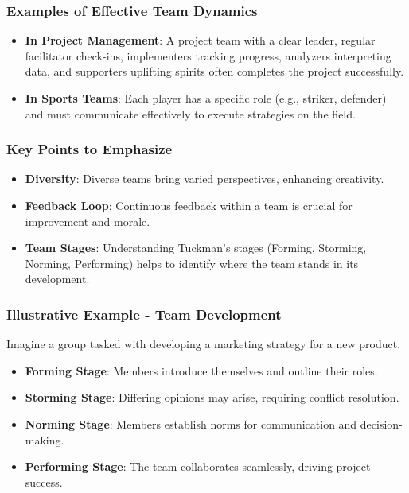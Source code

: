 \documentclass[aspectratio=169]{beamer}
\begin{document}
\begin{frame}[fragile]
    \frametitle{Examples of Effective Team Dynamics}
    \begin{itemize}
        \item \textbf{In Project Management}: A project team with a clear leader, regular facilitator check-ins, implementers tracking progress, analyzers interpreting data, and supporters uplifting spirits often completes the project successfully.
        \item \textbf{In Sports Teams}: Each player has a specific role (e.g., striker, defender) and must communicate effectively to execute strategies on the field.
    \end{itemize}
\end{frame}

\begin{frame}[fragile]
    \frametitle{Key Points to Emphasize}
    \begin{itemize}
        \item \textbf{Diversity}: Diverse teams bring varied perspectives, enhancing creativity.
        \item \textbf{Feedback Loop}: Continuous feedback within a team is crucial for improvement and morale.
        \item \textbf{Team Stages}: Understanding Tuckman's stages (Forming, Storming, Norming, Performing) helps to identify where the team stands in its development.
    \end{itemize}
\end{frame}

\begin{frame}[fragile]
    \frametitle{Illustrative Example - Team Development}
    Imagine a group tasked with developing a marketing strategy for a new product. 
    \begin{itemize}
        \item \textbf{Forming Stage}: Members introduce themselves and outline their roles.
        \item \textbf{Storming Stage}: Differing opinions may arise, requiring conflict resolution.
        \item \textbf{Norming Stage}: Members establish norms for communication and decision-making.
        \item \textbf{Performing Stage}: The team collaborates seamlessly, driving project success.
    \end{itemize}
\end{frame}
\end{document}

